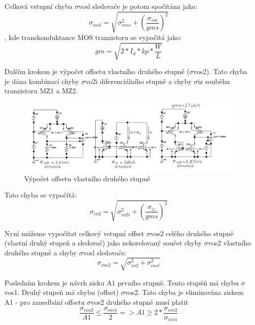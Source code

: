 Celková vstupní chyba $\sigma$vosl sledovače je potom spočítána jako:
\begin{equation}
\sigma_{vosl}=\sqrt{\sigma_{voss}^2+(\frac{\sigma_{voi}}{gms})^2}
\end{equation}
, kde transkonduktance MOS tranzistoru se vypočítá jako:
\begin{equation}
gm = \sqrt{2*I_{d}*kp*\frac{W}{L}}
\end{equation}

Dalším krokem je výpočet offsetu vlastního druhého stupně ($\sigma$vos2). Tato chyba je dána kombinací chyby $\sigma$vo2i diferenciálního stupně a chyby $\sigma$iz souběhu tranzistoru MZ1 a MZ2.

\begin{figure}[h]
   \begin{center}
     \includegraphics[scale=0.5]{images/offset2.png}
   \end{center}
   \caption{Výpočet offsetu vlastního druhého stupně}
\end{figure}
\pagebreak
Tato chyba se vypočítá:
\begin{equation}
\sigma_{vo2}=\sqrt{\sigma_{vo2i}^2+(\frac{\sigma_{iz}}{gms})^2}
\end{equation}

Nyní můžeme vypočítat celkový vstupní offset $\sigma$vos2 celého druhého stupně (vlastní druhý stupeň a sledovač) jako nekorelovaný součet chyby $\sigma$vos2 vlastního druhého stupně a chyby $\sigma$vosl sledovače:
\begin{equation}
\sigma_{vos2}=\sqrt{\sigma_{vo2}^2+\sigma_{vosl}^2}
\end{equation}

Posledním krokem je návrh zisku A1 prvního stupně. Tento stupěň má chybu $\sigma$vos1. Druhý stupeň má chybu (offset) $\sigma$vos2. Tato chyba je eliminována ziskem A1 - pro zanedbání offsetu $\sigma$vos2 druhého stupně musí platit
\begin{equation}
\frac{\sigma_{vos2}}{A1}\leq\frac{\sigma_{vos1}}{2} => A1\geq2*\frac{\sigma_{vos2}}{\sigma_{vos1}}
\end{equation}

